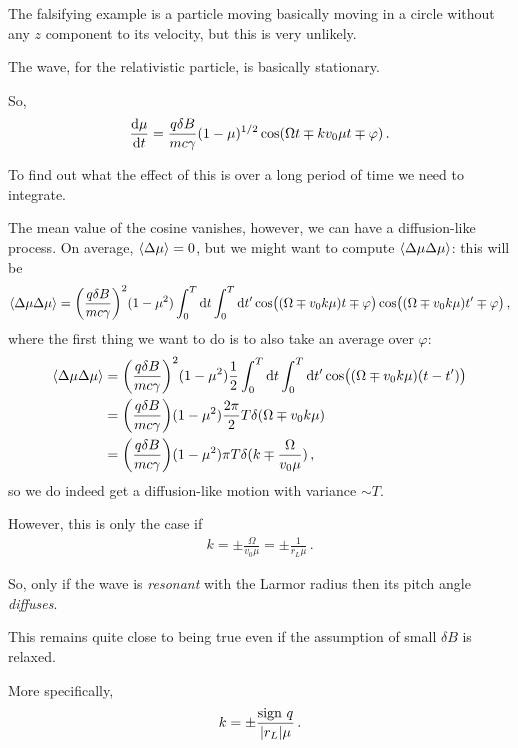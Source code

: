 \documentclass[main.tex]{subfiles}
\begin{document}
The falsifying example is a particle moving basically moving in a circle without any \(z\) component to its velocity, but this is very unlikely. 

The wave, for the relativistic particle, is basically stationary. 

So, 
%
\begin{align}
\dv{\mu }{t} = \frac{q \delta B}{mc \gamma } (1 - \mu )^{1/2} \cos(\Omega t \mp kv_0 \mu t \mp \varphi ) 
\,.
\end{align}

To find out what the effect of this is over a long period of time we need to integrate. 

The mean value of the cosine vanishes, however, we can have a diffusion-like process. 
On average, \(\expval{ \Delta \mu }= 0\), but we might want to compute \(\expval{ \Delta \mu \Delta \mu }\):
this will be 
%
\begin{align}
\expval{\Delta \mu  \Delta \mu } = \qty(\frac{q \delta B}{mc \gamma })^2 (1 - \mu^2) \int_0^{T} \dd{t} \int_0^{T} \dd{t'} 
\cos ( (\Omega \mp v_0 k \mu ) t \mp \varphi )
\cos ( (\Omega \mp v_0 k \mu ) t' \mp \varphi )
\,,
\end{align}
%
where the first thing we want to do is to also take an average over \(\varphi \): 
%
\begin{align}
\expval{\Delta \mu  \Delta \mu } &= \qty(\frac{q \delta B}{mc \gamma })^2 (1 - \mu^2) \frac{1}{2} \int_0^{T} \dd{t} \int_0^{T} \dd{t'} 
\cos ( (\Omega \mp v_0 k \mu ) (t-t'))  \\
&= \qty(\frac{q \delta B}{mc \gamma }) (1 - \mu^2) \frac{2 \pi }{2} T \delta (\Omega \mp v_0 k \mu )  \\
&= \qty(\frac{q \delta B}{mc \gamma }) (1 - \mu^2) \pi T \delta (k \mp \frac{\Omega}{v_0 \mu })
\,,
\end{align}
%
so we do indeed get a diffusion-like motion with variance \(\sim T\). 

However, this is only the case if 
%
\begin{align}
k = \pm \frac{\Omega }{v_0 \mu } = \pm \frac{1}{r_L \mu }
\,.
\end{align}

So, only if the wave is \emph{resonant} with the Larmor radius then its pitch angle \emph{diffuses}. 

This remains quite close to being true even if the assumption of small \(\delta B\) is relaxed. 

More specifically, 
%
\begin{align}
k = \pm \frac{\text{sign}\ q}{\abs{r_L} \mu }
\,.
\end{align}
\end{document}
